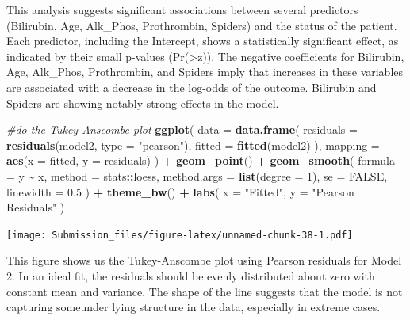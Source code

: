 \documentclass[
]{article}
\newenvironment{Shaded}{\begin{snugshade}}{\end{snugshade}}
\newcommand{\AttributeTok}[1]{\textcolor[rgb]{0.13,0.29,0.53}{#1}}
\newcommand{\CommentTok}[1]{\textcolor[rgb]{0.56,0.35,0.01}{\textit{#1}}}
\newcommand{\ConstantTok}[1]{\textcolor[rgb]{0.56,0.35,0.01}{#1}}
\newcommand{\DecValTok}[1]{\textcolor[rgb]{0.00,0.00,0.81}{#1}}
\newcommand{\FloatTok}[1]{\textcolor[rgb]{0.00,0.00,0.81}{#1}}
\newcommand{\FunctionTok}[1]{\textcolor[rgb]{0.13,0.29,0.53}{\textbf{#1}}}
\newcommand{\NormalTok}[1]{#1}
\newcommand{\SpecialCharTok}[1]{\textcolor[rgb]{0.81,0.36,0.00}{\textbf{#1}}}
\newcommand{\StringTok}[1]{\textcolor[rgb]{0.31,0.60,0.02}{#1}}
\begin{document}
This analysis suggests significant associations between several
predictors (Bilirubin, Age, Alk\_Phos, Prothrombin, Spiders) and the
status of the patient. Each predictor, including the Intercept, shows a
statistically significant effect, as indicated by their small p-values
(Pr(\textgreater\textbar z\textbar)). The negative coefficients for
Bilirubin, Age, Alk\_Phos, Prothrombin, and Spiders imply that increases
in these variables are associated with a decrease in the log-odds of the
outcome. Bilirubin and Spiders are showing notably strong effects in the
model.

\begin{Shaded}
\begin{Highlighting}[]
\CommentTok{\#do the Tukey{-}Anscombe plot}
\FunctionTok{ggplot}\NormalTok{(}
  \AttributeTok{data =} \FunctionTok{data.frame}\NormalTok{(}
    \AttributeTok{residuals =} \FunctionTok{residuals}\NormalTok{(model2, }\AttributeTok{type =} \StringTok{"pearson"}\NormalTok{),}
    \AttributeTok{fitted =} \FunctionTok{fitted}\NormalTok{(model2)}
\NormalTok{  ),}
  \AttributeTok{mapping =} \FunctionTok{aes}\NormalTok{(}\AttributeTok{x =}\NormalTok{ fitted, }\AttributeTok{y =}\NormalTok{ residuals)}
\NormalTok{) }\SpecialCharTok{+}
  \FunctionTok{geom\_point}\NormalTok{() }\SpecialCharTok{+}
  \FunctionTok{geom\_smooth}\NormalTok{(}
    \AttributeTok{formula =}\NormalTok{ y }\SpecialCharTok{\textasciitilde{}}\NormalTok{ x,}
    \AttributeTok{method =}\NormalTok{ stats}\SpecialCharTok{::}\NormalTok{loess,}
    \AttributeTok{method.args =} \FunctionTok{list}\NormalTok{(}\AttributeTok{degree =} \DecValTok{1}\NormalTok{),}
    \AttributeTok{se =} \ConstantTok{FALSE}\NormalTok{,}
    \AttributeTok{linewidth =} \FloatTok{0.5}
\NormalTok{  ) }\SpecialCharTok{+}
  \FunctionTok{theme\_bw}\NormalTok{() }\SpecialCharTok{+}
  \FunctionTok{labs}\NormalTok{(}
    \AttributeTok{x =} \StringTok{"Fitted"}\NormalTok{,}
    \AttributeTok{y =} \StringTok{"Pearson Residuals"}
\NormalTok{  )}
\end{Highlighting}
\end{Shaded}

\texttt{[image: Submission\_files/figure-latex/unnamed-chunk-38-1.pdf]}

This figure shows us the Tukey-Anscombe plot using Pearson residuals for
Model 2. In an ideal fit, the residuals should be evenly distributed
about zero with constant mean and variance. The shape of the line
suggests that the model is not capturing someunder lying structure in
the data, especially in extreme cases.
\end{document}
